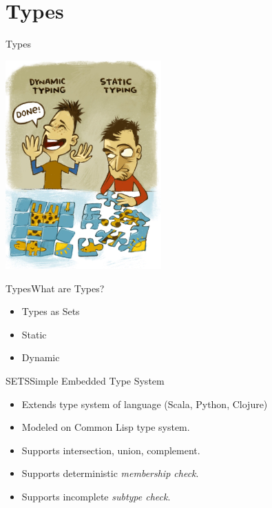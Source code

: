 \section{Types}
\begin{frame}{Types}
  \centering
  
    \includegraphics[height=8cm]{typing.png}
\end{frame}

\begin{frame}{Types}{What are Types?}
  \begin{itemize}
  \item Types as Sets
  \item Static
  \item Dynamic
  \end{itemize}
\end{frame}

\begin{frame}{SETS}{Simple Embedded Type System}

  \scalebox{1.0}{}

  \begin{itemize}
  \item   Extends type system of language (Scala, Python, Clojure)
  \item   Modeled on Common Lisp type system.
  \item   Supports intersection, union, complement.
  \item   Supports deterministic \emph{membership check}.
  \item   Supports incomplete \emph{subtype check}.
  \end{itemize}
\end{frame}

